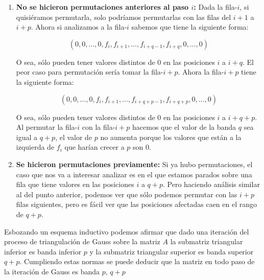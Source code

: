\begin{enumerate}
    \item {\bf No se hicieron permutaciones anteriores al paso $i$:} Dada la fila-$i$, si quisiéramos permutarla, solo podríamos permutarlas con las filas del $i + 1$ a $i + p$. Ahora si analizamos a la fila-$i$ sabemos que tiene la siguiente forma:

    \begin{displaymath}
        (0, 0, \dots, 0, f_i, f_{i + 1}, \dots, f_{i + q - 1}, f_{i + q}, 0, \dots, 0)
    \end{displaymath}

    O sea, sólo pueden tener valores distintos de $0$ en las posiciones $i$ a $i + q$. El peor caso para permutación sería tomar la fila-${i + p}$. Ahora la fila-${i + p}$ tiene la siguiente forma:

    \begin{displaymath}
        (0, 0, \dots, 0, f_i, f_{i + 1}, \dots, f_{i + q + p - 1}, f_{i + q + p}, 0, \dots, 0)
    \end{displaymath}

    O sea, sólo pueden tener valores distintos de $0$ en las posiciones $i$ a $i + q + p$. Al permutar la fila-$i$ con la fila-${i + p}$ hacemos que el valor de la banda $q$ sea igual a $q + p$, el valor de $p$ no aumenta porque los valores que están a la izquierda de $f_i$ que harían crecer a $p$ son 0.

    \item {\bf Se hicieron permutaciones previamente:} Si ya hubo permutaciones, el caso que nos va a interesar analizar es en el que estamos parados sobre una fila que tiene valores en las posiciones $i$ a $q + p$. Pero haciendo análisis similar al del punto anterior, podemos ver que sólo podemos permutar con las $i + p$ filas siguientes, pero es fácil ver que las posiciones afectadas caen en el rango de $q + p$.
\end{enumerate}

Esbozando un esquema inductivo podemos afirmar que dado una iteración del proceso de triangulación de Gauss sobre la matriz $A$ la submatriz triangular inferior es banda inferior $p$ y la submatriz triangular superior es banda superior $q + p$. Cumpliendo estas normas se puede deducir que la matriz en todo paso de la iteración de Gauss es banda $p$, $q + p$
